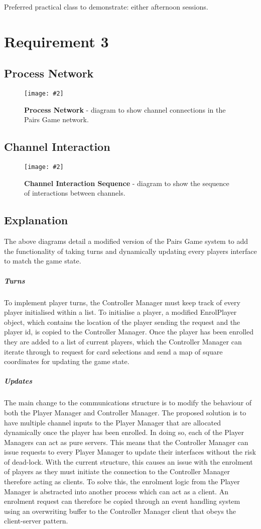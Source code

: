 \documentclass[10pt, a4paper]{article}
\title{\mytitle}
\author{\myauthor\hspace{1em}\\\contact\\Edinburgh Napier University\hspace{0.5em}-\hspace{0.5em}\mymodule}
\date{}
\newcommand{\figuremacro}[5]{
    \begin{figure}[#1]
        \centering
        \texttt{[image: \#2]}
        \caption[#3]{\textbf{#3}#4}
        \label{fig:#2}
    \end{figure}
}
\begin{document}
	\maketitle	
	
	
	Preferred practical class to demonstrate: either afternoon sessions.
	\section{Requirement 3}
	
	\subsection{Process Network}
	
	\figuremacro{H}{processNetwork}{Process Network}{ - diagram to show channel connections in the Pairs Game network.}{1.0}
	
	\subsection{Channel Interaction}
	
	\figuremacro{H}{channelInt}{Channel Interaction Sequence}{ - diagram to show the sequence of interactions between channels.}{1.0}
	
	\subsection{Explanation}
	
	The above diagrams detail a modified version of the Pairs Game system to add the functionality of taking turns and dynamically updating every players interface to match the game state.
	
	\subparagraph{Turns}	
	To implement player turns, the Controller Manager must keep track of every player initialised within a list. To initialise a player, a modified EnrolPlayer object, which contains the location of the player sending the request and the player id, is copied to the Controller Manager. Once the player has been enrolled they are added to a list of current players, which the Controller Manager can iterate through to request for card selections and send a map of square coordinates for updating the game state.
	
	\subparagraph{Updates}
	The main change to the communications structure is to modify the behaviour of both the Player Manager and Controller Manager.	The proposed solution is to have multiple channel inputs to the Player Manager that are allocated dynamically once the player has been enrolled. In doing so, each of the Player Managers can act as pure servers. This means that the Controller Manager can issue requests to every Player Manager to update their interfaces without the risk of dead-lock. With the current structure, this causes an issue with the enrolment of players as they must initiate the connection to the Controller Manager therefore acting as clients. To solve this, the enrolment logic from the Player Manager is abstracted into another process which can act as a client. An enrolment request can therefore be copied through an event handling system using an overwriting buffer to the Controller Manager client that obeys the client-server pattern.
		
\end{document}
